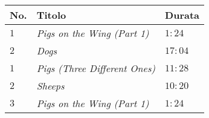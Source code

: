 \documentclass{standalone}
\begin{document}
    \begin{tabular}{l l l}
        \toprule
        \textbf{No.} & \textbf{Titolo} & \textbf{Durata} \\
        \midrule
        \(1\)            & \emph{Pigs on the Wing (Part 1)}     & \(1:24\) \\
        \(2\)       & \emph{Dogs}   & \(17:04\) \\
        \midrule
        \(1\)   & \emph{Pigs (Three Different Ones)}    & \(11:28\)\\ 
        \(2\) & \emph{Sheeps}     & \(10:20\)\\
        \(3\)    & \emph{Pigs on the Wing (Part 1)}    & \(1:24\) \\
        \bottomrule
    \end{tabular}
\end{document}
